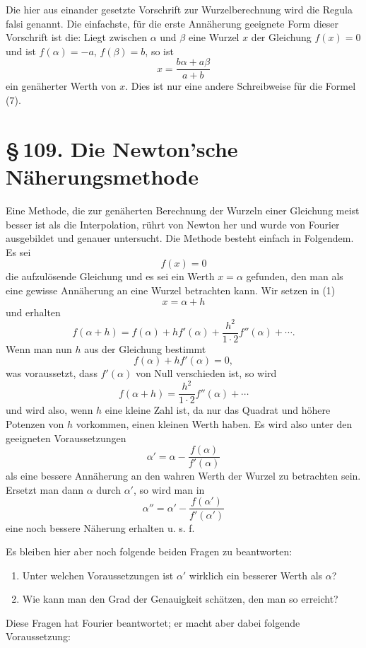 \documentclass[11pt]{article}
\providecommand{\sect}[2]{\section*{\S\,#1. #2}}
\begin{document}
Die hier aus einander gesetzte Vorschrift zur Wurzelberechnung wird die Regula falsi genannt. Die einfachste, für die erste Annäherung geeignete Form dieser Vorschrift ist die: Liegt zwischen $\alpha$ und $\beta$ eine Wurzel $x$ der Gleichung $f(x)=0$ und ist $f(\alpha)=-a$, $f(\beta)=b$, so ist
\begin{equation}
        x=\frac{b\alpha+a\beta}{a+b}
\tag{9}
\end{equation}
ein genäherter Werth von $x$. Dies ist nur eine andere Schreibweise für die Formel (7).

\sect{109}{Die Newton'sche Näherungsmethode}

Eine Methode, die zur genäherten Berechnung der Wurzeln einer Gleichung meist besser ist als die Interpolation, rührt von Newton her und wurde von Fourier ausgebildet und genauer untersucht. Die Methode besteht einfach in Folgendem. Es sei
\begin{equation}
        f(x)=0
\tag{1}
\end{equation}
die aufzulösende Gleichung und es sei ein Werth $x=\alpha$ gefunden, den man als eine gewisse Annäherung an eine Wurzel betrachten kann. Wir setzen in (1)
\[
        x=\alpha+h
\]
und erhalten
\begin{equation}
        f(\alpha+h)=f(\alpha)+hf'(\alpha)+\frac{h^2}{1\cdot2}f''(\alpha)+\cdots .
\tag{2}
\end{equation}
Wenn man nun $h$ aus der Gleichung bestimmt
\begin{equation}
        f(\alpha)+hf'(\alpha)=0,
\tag{3}
\end{equation}
was voraussetzt, dass $f'(\alpha)$ von Null verschieden ist, so wird
\[
        f(\alpha+h)=\frac{h^2}{1\cdot2}f''(\alpha)+\cdots
\]
und wird also, wenn $h$ eine kleine Zahl ist, da nur das Quadrat und höhere Potenzen von $h$ vorkommen, einen kleinen Werth haben. Es wird also unter den geeigneten Voraussetzungen
\begin{equation}
        \alpha'=\alpha-\frac{f(\alpha)}{f'(\alpha)}
\tag{4}
\end{equation}
als eine bessere Annäherung an den wahren Werth der Wurzel zu betrachten sein. Ersetzt man dann $\alpha$ durch $\alpha'$, so wird man in
\[
        \alpha''=\alpha'-\frac{f(\alpha')}{f'(\alpha')}
\]
eine noch bessere Näherung erhalten u. s. f.

Es bleiben hier aber noch folgende beiden Fragen zu beantworten:
\begin{enumerate}[label=\arabic*.]
\item Unter welchen Voraussetzungen ist $\alpha'$ wirklich ein besserer Werth als $\alpha$?
\item Wie kann man den Grad der Genauigkeit schätzen, den man so erreicht?
\end{enumerate}
Diese Fragen hat Fourier beantwortet; er macht aber dabei folgende Voraussetzung:
\end{document}
